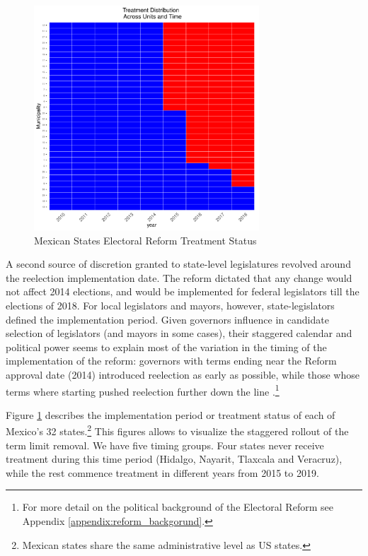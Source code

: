 \documentclass[12pt]{amsart}
\numberwithin{equation}{section}
\theoremstyle{definition}
\theoremstyle{definition}
\theoremstyle{definition}
\begin{document}
\begin{figure}[h]   
\centering 
\caption{Mexican States Electoral Reform Treatment Status}
\label{fig:treatment_status}
\includegraphics[width=0.75\textwidth]{../Figures_incumbency/reform_treatmentstatus.pdf}     
\captionsetup{justification=centering} 
\end{figure}     
    
 
A second source of discretion granted to state-level legislatures revolved around the reelection implementation date. The reform dictated that any change would not affect 2014 elections, and would be implemented for federal legislators till the elections of 2018. For local legislators and mayors, however, state-legislators defined the implementation period. Given governors influence in candidate selection of legislators (and mayors in some cases), their staggered calendar and political power seems to explain most of the variation in the timing of the implementation of the reform: governors with terms ending near the Reform approval date (2014) introduced reelection as early as possible, while those whose terms where starting pushed reelection further down the line \citep{motolinia_2020}.\footnote{For more detail on the political background of the Electoral Reform see Appendix \ref{appendix:reform_backgorund}.}
   
Figure \ref{fig:treatment_status} describes the implementation period or treatment status of each of Mexico's 32 states.\footnote{Mexican states share the same administrative level as US states.} This figures allows to visualize the staggered rollout of the term limit removal. We have five timing groups. Four states never receive treatment during this time period (Hidalgo, Nayarit, Tlaxcala and Veracruz), while the rest commence treatment in different years from 2015 to 2019. %
    
\end{document}
